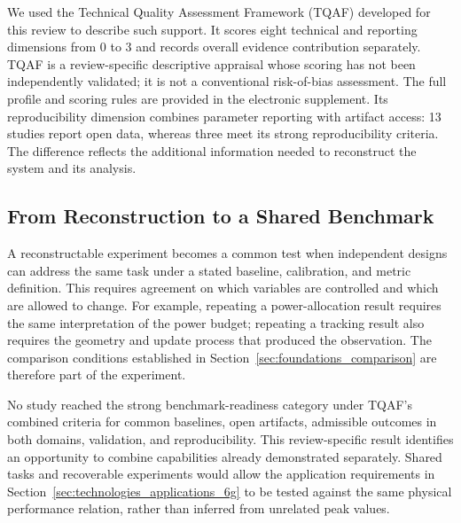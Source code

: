 We used the Technical Quality Assessment Framework (TQAF) developed for this
review to describe such support. It scores eight technical and reporting
dimensions from 0 to 3 and records overall evidence contribution separately.
TQAF is a review-specific descriptive appraisal whose scoring has not been
independently validated; it is not a conventional risk-of-bias assessment.
The full profile and scoring rules are provided in the electronic supplement.
Its reproducibility dimension combines parameter reporting with artifact
access: 13 studies report open data, whereas three meet its strong
reproducibility criteria. The difference reflects the additional information
needed to reconstruct the system and its analysis.

\subsection{From Reconstruction to a Shared Benchmark}

A reconstructable experiment becomes a common test when independent designs
can address the same task under a stated baseline, calibration, and metric
definition. This requires agreement on which variables are controlled and
which are allowed to change. For example, repeating a power-allocation result
requires the same interpretation of the power budget; repeating a tracking
result also requires the geometry and update process that produced the
observation. The comparison conditions established in
Section~\ref{sec:foundations_comparison} are therefore part of the experiment.

No study reached the strong benchmark-readiness category under TQAF's combined
criteria for common baselines, open artifacts, admissible outcomes in both
domains, validation, and reproducibility. This review-specific result identifies
an opportunity to combine capabilities already demonstrated separately. Shared
tasks and recoverable experiments would allow the application requirements in
Section~\ref{sec:technologies_applications_6g} to be tested against the same
physical performance relation, rather than inferred from unrelated peak values.
